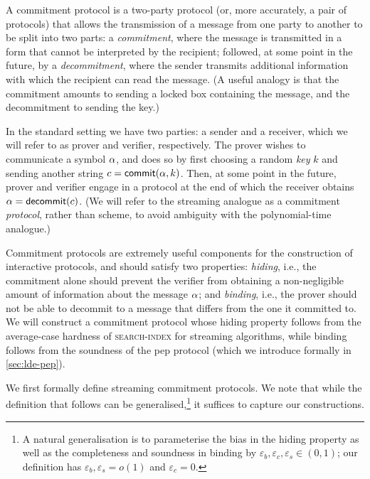 \documentclass[a4paper,UKenglish,cleveref, autoref, thm-restate]{lipics-v2021}
\theoremstyle{definition}
\newcommand{\eps}{\varepsilon}
\newcommand{\searchindex}{\normalfont\textsc{search-index}\xspace}
\newcommand{\pepprotocol}{\textsf{pep}\xspace}
\def\symbol#1{
    \ifnum#1=1
        \alpha
    \else
    \ifnum#1=2
        \beta
    \else
    \ifnum#1=3
        \gamma
    \fi\fi\fi
}
\def\fe#1{
    \ifnum#1=1
        \alpha
    \else
    \ifnum#1=2
        \beta
    \else
    \ifnum#1=3
        \gamma
    \fi\fi\fi
}
\begin{document}
A commitment protocol is a two-party protocol (or, more accurately, a pair of protocols) that allows the transmission of a message from one party to another to be split into two parts: a \emph{commitment}, where the message is transmitted in a form that cannot be interpreted by the recipient; followed, at some point in the future, by a \emph{decommitment}, where the sender transmits additional information with which the recipient can read the message. (A useful analogy is that the commitment amounts to sending a locked box containing the message, and the decommitment to sending the key.)

In the standard setting \cite{B83} we have two parties: a sender and a receiver, which we will refer to as prover and verifier, respectively. The prover wishes to communicate a symbol $\symbol1$, and does so by first choosing a random \emph{key} $k$ and sending another string $c=\textsf{commit}(\symbol1,k)$. Then, at some point in the future, prover and verifier engage in a protocol at the end of which the receiver obtains $\fe1 = \textsf{decommit}(c)$. (We will refer to the streaming analogue as a commitment \emph{protocol}, rather than scheme, to avoid ambiguity with the polynomial-time analogue.)

Commitment protocols are extremely useful components for the construction of interactive protocols, and should satisfy two properties: \emph{hiding}, i.e., the commitment alone should prevent the verifier from obtaining a non-negligible amount of information about the message $\symbol1$; and \emph{binding}, i.e., the prover should not be able to decommit to a message that differs from the one it committed to. 
We will construct a commitment protocol whose hiding property follows from the average-case hardness of \searchindex for streaming algorithms, while binding follows from the soundness of the \pepprotocol protocol (which we introduce formally in \cref{sec:lde-pep}).

We first formally define streaming commitment protocols. We note that while the definition that follows can be generalised,\footnote{A natural generalisation is to parameterise the bias in the hiding property as well as the completeness and soundness in binding by $\eps_b, \eps_c, \eps_s \in (0,1)$; our definition has $\eps_b, \eps_s = o(1)$ and $\eps_c = 0$.} it suffices to capture our constructions.
\end{document}

